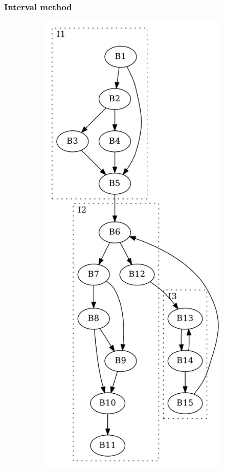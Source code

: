 \documentclass[aspectratio=1610]{beamer}
\begin{document}
\begin{frame}
	\frametitle{Interval method}
	\begin{figure}[htbp]
		\centering
		\begin{subfigure}[b]{0.18\textwidth}
			\centering
			\includegraphics[width=\textwidth]{inc/methods/interval/G_1.png}

\end{subfigure}
\end{figure}
\end{frame}
\end{document}

